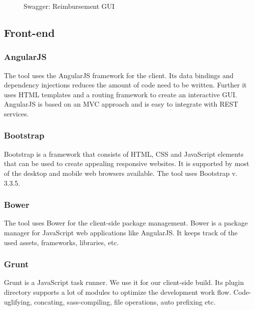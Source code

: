\begin{figure}[H]
    \centering
    \caption{Swagger: Reimbursement GUI}
    \label{fig:swagger01}
\end{figure}

\subsection{Front-end}

\subsubsection{AngularJS}
The tool uses the AngularJS framework for the client. Its data bindings and dependency injections reduces the amount of code need to be written. Further it uses HTML templates and a routing framework to create an interactive GUI. AngularJS is based on an MVC approach and is easy to integrate with REST services. \cite{angular}   

\subsubsection{Bootstrap}
Bootstrap is a framework that consists of HTML, CSS and JavaScript elements that can be used to create appealing responsive websites. It is supported by most of the desktop and mobile web browsers available. The tool uses Bootstrap v. 3.3.5. \cite{bootstrap}

\subsubsection{Bower}
The tool uses Bower for the client-side package management. Bower is a package manager for JavaScript web applications like AngularJS. It keeps track of the used assets, frameworks, libraries, etc. \cite{bower}  

\subsubsection{Grunt}
Grunt is a JavaScript task runner. We use it for our client-side build. Its plugin directory supports a lot of modules to optimize the development work flow. Code-uglifying, concating, sass-compiling, file operations, auto prefixing etc. \cite{grunt} 
